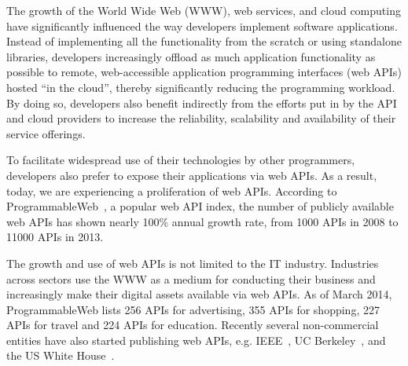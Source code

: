 The growth of the World Wide Web (WWW), web services, and cloud computing have significantly influenced the
way developers implement software applications. Instead of implementing all the functionality from
the scratch or using standalone libraries, developers increasingly offload
as much application functionality as possible to remote,
web-accessible application programming interfaces (web APIs) hosted ``in the
cloud'', thereby significantly reducing the 
programming workload. By doing so, developers also benefit indirectly from the efforts put in 
by the API and cloud providers to 
increase the reliability, scalability and availability of their service offerings. 

To facilitate widespread use of their technologies by other programmers, developers 
also prefer to expose their applications via web APIs.
As a result, today, we are experiencing a proliferation of web APIs. According to
ProgrammableWeb~\cite{pweb}, a popular web API index, the number of publicly available
web APIs has shown nearly 100\% annual growth rate, from 1000 APIs in 2008 to 11000 APIs in 2013. 

The growth and use of web APIs is not limited to the IT industry. 
Industries across sectors use the WWW as a medium for conducting their 
business and increasingly make their digital assets available via web APIs. 
As of March 2014, ProgrammableWeb lists 256 APIs for advertising, 
355 APIs for shopping, 227 APIs for travel and 224 APIs for education.
Recently several non-commercial entities have also started publishing web 
APIs, e.g. IEEE~\cite{ieeeapis}, UC Berkeley~\cite{ucbapis}, and the US White
House~\cite{whitehouseapis}.  %


